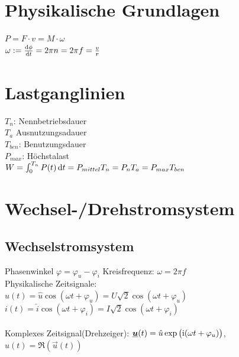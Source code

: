 \documentclass[fs, footer]{latex4ei}
\begin{document}
\begin{multicols}{4}



    \section{Physikalische Grundlagen}
    $P = F \cdot v = M \cdot \omega$ \\
    $\omega := \frac{\diff \phi}{\diff t} = 2 \pi n = 2 \pi f = \frac{v}{r}$ \\


    \section{Lastganglinien}
    $T_n$: Nennbetriebsdauer\\
    $T_a$ Ausnutzungsadauer\\
    $T_{ben}$: Benutzungsdauer\\
    $P_{max}$: Höchstalast\\
    $W = \int_0^{T_n} P(t) \diff t = P_{mittel} T_n = P_n T_a = P_{max} T_{ben}$\\

    \section{Wechsel-/Drehstromsystem}


    \subsection{Wechselstromsystem}
    Phasenwinkel $\varphi = \varphi_u - \varphi_i$ \qquad Kreisfrequenz: $\omega = 2\pi f$\\


    Physikalische Zeitsignale:\\
    $u(t) = \hat u \cos(\omega t + \varphi_u) = U \sqrt{2} \cos(\omega t + \varphi_u)$\\
    $i(t) = \hat i \cos(\omega t + \varphi_i) = I \sqrt{2} \cos(\omega t + \varphi_i)$\\
    \\
    Komplexes Zeitsignal(Drehzeiger): $\underline{\boldsymbol {u}}(t) = \hat u \exp\big(\mathrm{i} (\omega t + \varphi_u)\big)$,
    $u(t) = \Re(\vec u(t))$\\



\end{multicols}
\end{document}

